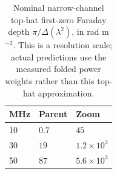 \begin{table}[htbp]
\centering\small
\caption{Nominal narrow-channel top-hat first-zero Faraday depth $\pi/\Delta(\lambda^2)$, in rad m$^{-2}$. This is a resolution scale; actual predictions use the measured folded power weights rather than this top-hat approximation.}
\label{tab:resolution}
\begin{tabular}{lll}
\toprule
MHz & Parent & Zoom\\
\midrule
10 & $0.7$ & $45$\\
30 & $19$ & $1.2\times10^{3}$\\
50 & $87$ & $5.6\times10^{3}$\\
\bottomrule
\end{tabular}
\end{table}
